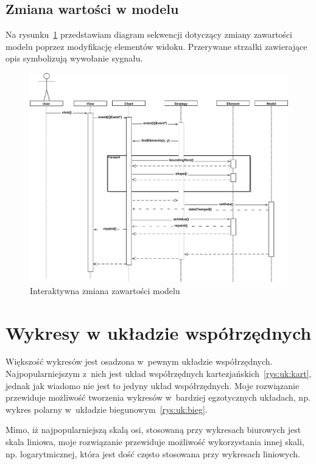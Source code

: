 \subsection{Zmiana wartości w modelu}
Na rysunku~\ref{rys:seq:inter} przedstawiam diagram sekwencji dotyczący zmiany zawartości modelu poprzez modyfikację elementów widoku. Przerywane strzałki zawierające opis symbolizują wywołanie sygnału.

\begin{figure}[H]
\centering
\includegraphics[scale=0.6]{img/seq_inter.pdf}
\caption{Interaktywna zmiana zawartości modelu}\label{rys:seq:inter}
\end{figure}

\section{Wykresy w układzie współrzędnych}
Większość wykresów jest osadzona w~pewnym układzie współrzędnych. Najpopularniejszym z~nich jest układ współrzędnych kartezjańskich~\ref{rys:uk:kart}, jednak jak wiadomo nie jest to jedyny układ współrzędnych. Moje rozwiązanie przewiduje możliwość tworzenia wykresów w~bardziej egzotycznych układach, np. wykres polarny w~układzie biegunowym~\ref{rys:uk:bieg}.

Mimo, iż najpopularniejszą skalą osi, stosowaną przy wykresach biurowych jest skala liniowa, moje rozwiązanie przewiduje możliwość wykorzystania innej skali, np. logarytmicznej, która jest dość często stosowana przy wykresach liniowych. 

